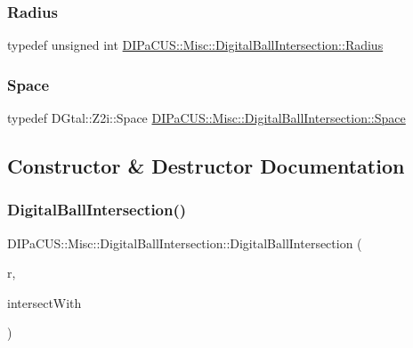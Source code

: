 \subsubsection{\texorpdfstring{Radius}{Radius}}
{\footnotesize\ttfamily typedef unsigned int \mbox{\hyperlink{classDIPaCUS_1_1Misc_1_1DigitalBallIntersection_a8c17265617201b52046579d379b3e269}{D\+I\+Pa\+C\+U\+S\+::\+Misc\+::\+Digital\+Ball\+Intersection\+::\+Radius}}}

\mbox{\label{classDIPaCUS_1_1Misc_1_1DigitalBallIntersection_a70219652541b1d322f832184d5f79209}} 
\subsubsection{\texorpdfstring{Space}{Space}}
{\footnotesize\ttfamily typedef D\+Gtal\+::\+Z2i\+::\+Space \mbox{\hyperlink{classDIPaCUS_1_1Misc_1_1DigitalBallIntersection_a70219652541b1d322f832184d5f79209}{D\+I\+Pa\+C\+U\+S\+::\+Misc\+::\+Digital\+Ball\+Intersection\+::\+Space}}}



\subsection{Constructor \& Destructor Documentation}
\mbox{\label{classDIPaCUS_1_1Misc_1_1DigitalBallIntersection_ad8f01116b05a8879e0644b57957810d0}} 
\subsubsection{\texorpdfstring{Digital\+Ball\+Intersection()}{DigitalBallIntersection()}}
{\footnotesize\ttfamily D\+I\+Pa\+C\+U\+S\+::\+Misc\+::\+Digital\+Ball\+Intersection\+::\+Digital\+Ball\+Intersection (\begin{DoxyParamCaption}\item[{\mbox{\hyperlink{classDIPaCUS_1_1Misc_1_1DigitalBallIntersection_a8c17265617201b52046579d379b3e269}{Radius}}}]{r,  }\item[{const \mbox{\hyperlink{classDIPaCUS_1_1Misc_1_1DigitalBallIntersection_aaed19d165964a423d69f19a3de0d5587}{Digital\+Set}} \&}]{intersect\+With }\end{DoxyParamCaption})}



